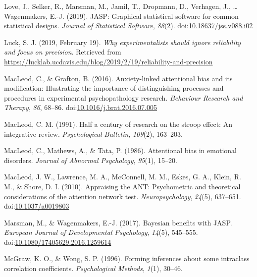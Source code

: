 \documentclass[english,,man,floatsintext]{apa6}
\begin{document}
\leavevmode\hypertarget{ref-love_jasp:_2019}{}%
Love, J., Selker, R., Marsman, M., Jamil, T., Dropmann, D., Verhagen, J., \ldots{} Wagenmakers, E.-J. (2019). JASP: Graphical statistical software for common statistical designs. \emph{Journal of Statistical Software}, \emph{88}(2). doi:\href{https://doi.org/10.18637/jss.v088.i02}{10.18637/jss.v088.i02}

\leavevmode\hypertarget{ref-luck_why_2019}{}%
Luck, S. J. (2019, February 19). \emph{Why experimentalists should ignore reliability and focus on precision}. Retrieved from \url{https://lucklab.ucdavis.edu/blog/2019/2/19/reliability-and-precision}

\leavevmode\hypertarget{ref-macleod_anxiety-linked_2016}{}%
MacLeod, C., \& Grafton, B. (2016). Anxiety-linked attentional bias and its modification: Illustrating the importance of distinguishing processes and procedures in experimental psychopathology research. \emph{Behaviour Research and Therapy}, \emph{86}, 68--86. doi:\href{https://doi.org/10.1016/j.brat.2016.07.005}{10.1016/j.brat.2016.07.005}

\leavevmode\hypertarget{ref-macleod_half_1991}{}%
MacLeod, C. M. (1991). Half a century of research on the stroop effect: An integrative review. \emph{Psychological Bulletin}, \emph{109}(2), 163--203.

\leavevmode\hypertarget{ref-macleod_attentional_1986}{}%
MacLeod, C., Mathews, A., \& Tata, P. (1986). Attentional bias in emotional disorders. \emph{Journal of Abnormal Psychology}, \emph{95}(1), 15--20.

\leavevmode\hypertarget{ref-macleod_appraising_2010}{}%
MacLeod, J. W., Lawrence, M. A., McConnell, M. M., Eskes, G. A., Klein, R. M., \& Shore, D. I. (2010). Appraising the ANT: Psychometric and theoretical considerations of the attention network test. \emph{Neuropsychology}, \emph{24}(5), 637--651. doi:\href{https://doi.org/10.1037/a0019803}{10.1037/a0019803}

\leavevmode\hypertarget{ref-marsman_bayesian_2017}{}%
Marsman, M., \& Wagenmakers, E.-J. (2017). Bayesian benefits with JASP. \emph{European Journal of Developmental Psychology}, \emph{14}(5), 545--555. doi:\href{https://doi.org/10.1080/17405629.2016.1259614}{10.1080/17405629.2016.1259614}

\leavevmode\hypertarget{ref-mcgraw_forming_1996}{}%
McGraw, K. O., \& Wong, S. P. (1996). Forming inferences about some intraclass correlation coefficients. \emph{Psychological Methods}, \emph{1}(1), 30--46.
\end{document}
